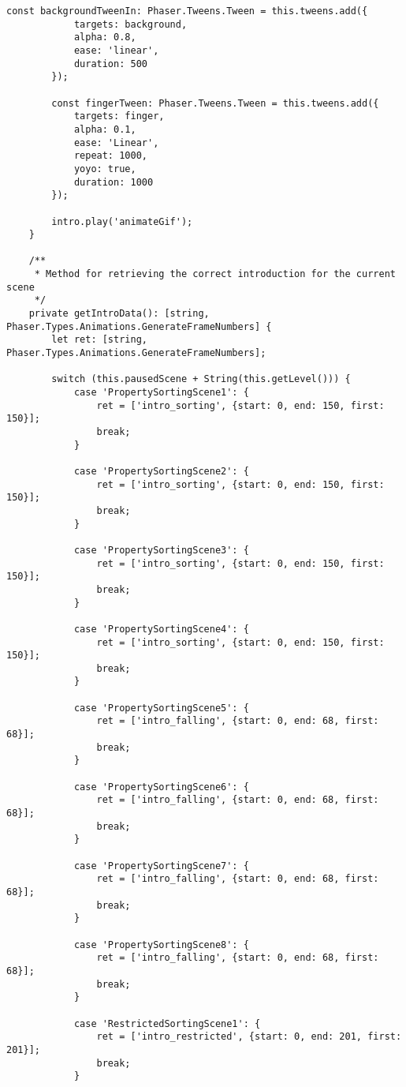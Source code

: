 \begin{lstlisting}[style=TypeScript, caption={introScene.ts}]
        const backgroundTweenIn: Phaser.Tweens.Tween = this.tweens.add({
            targets: background,
            alpha: 0.8,
            ease: 'linear',
            duration: 500
        });

        const fingerTween: Phaser.Tweens.Tween = this.tweens.add({
            targets: finger,
            alpha: 0.1,
            ease: 'Linear',
            repeat: 1000,
            yoyo: true,
            duration: 1000
        });

        intro.play('animateGif');
    }

    /**
     * Method for retrieving the correct introduction for the current scene
     */
    private getIntroData(): [string, Phaser.Types.Animations.GenerateFrameNumbers] {
        let ret: [string, Phaser.Types.Animations.GenerateFrameNumbers];

        switch (this.pausedScene + String(this.getLevel())) {
            case 'PropertySortingScene1': {
                ret = ['intro_sorting', {start: 0, end: 150, first: 150}];
                break;
            }

            case 'PropertySortingScene2': {
                ret = ['intro_sorting', {start: 0, end: 150, first: 150}];
                break;
            }

            case 'PropertySortingScene3': {
                ret = ['intro_sorting', {start: 0, end: 150, first: 150}];
                break;
            }

            case 'PropertySortingScene4': {
                ret = ['intro_sorting', {start: 0, end: 150, first: 150}];
                break;
            }

            case 'PropertySortingScene5': {
                ret = ['intro_falling', {start: 0, end: 68, first: 68}];
                break;
            }

            case 'PropertySortingScene6': {
                ret = ['intro_falling', {start: 0, end: 68, first: 68}];
                break;
            }

            case 'PropertySortingScene7': {
                ret = ['intro_falling', {start: 0, end: 68, first: 68}];
                break;
            }

            case 'PropertySortingScene8': {
                ret = ['intro_falling', {start: 0, end: 68, first: 68}];
                break;
            }

            case 'RestrictedSortingScene1': {
                ret = ['intro_restricted', {start: 0, end: 201, first: 201}];
                break;
            }


\end{lstlisting}

